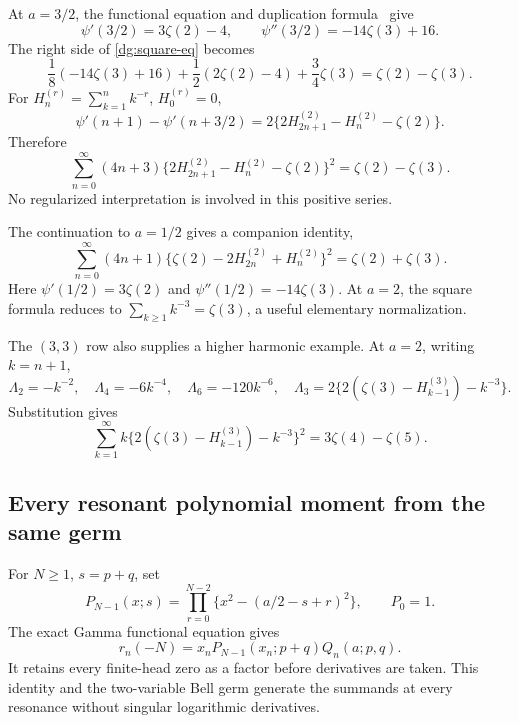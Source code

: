 At $a=3/2$, the functional equation and duplication formula~\cite{DLMFPolygamma} give
\[
 \psi'(3/2)=3\zeta(2)-4,\qquad
 \psi''(3/2)=-14\zeta(3)+16.
\]
The right side of \eqref{dg:square-eq} becomes
\[
 \frac18(-14\zeta(3)+16)
 +\frac12(2\zeta(2)-4)+\frac34\zeta(3)
 =\zeta(2)-\zeta(3).
\]
For $H_n^{(r)}=\sum_{k=1}^nk^{-r}$, $H_0^{(r)}=0$,
\[
 \psi'(n+1)-\psi'(n+3/2)
 =2\{2H_{2n+1}^{(2)}-H_n^{(2)}-\zeta(2)\}.
\]
Therefore
\begin{equation}
 \boxed{\sum_{n=0}^{\infty}(4n+3)
 \{2H_{2n+1}^{(2)}-H_n^{(2)}-\zeta(2)\}^{2}
 =\zeta(2)-\zeta(3).}
 \label{dg:half-harmonic-square}
\end{equation}
No regularized interpretation is involved in this positive series.

The continuation to $a=1/2$ gives a companion identity,
\begin{equation}
 \sum_{n=0}^{\infty}(4n+1)
 \{\zeta(2)-2H_{2n}^{(2)}+H_n^{(2)}\}^{2}
 =\zeta(2)+\zeta(3).
 \label{dg:other-half-harmonic-square}
\end{equation}
Here $\psi'(1/2)=3\zeta(2)$ and
$\psi''(1/2)=-14\zeta(3)$. At $a=2$, the square formula reduces to
$\sum_{k\geq1}k^{-3}=\zeta(3)$, a useful elementary normalization.

The $(3,3)$ row also supplies a higher harmonic example. At $a=2$,
writing $k=n+1$,
\[
 \Lambda_2=-k^{-2},\quad \Lambda_4=-6k^{-4},\quad
 \Lambda_6=-120k^{-6},\quad
 \Lambda_3=2\{2(\zeta(3)-H_{k-1}^{(3)})-k^{-3}\}.
\]
Substitution gives
\begin{equation}
 \boxed{\sum_{k=1}^{\infty}k
 \{2(\zeta(3)-H_{k-1}^{(3)})-k^{-3}\}^2
 =3\zeta(4)-\zeta(5).}
 \label{dg:cubic-tail-square}
\end{equation}

\subsection{Every resonant polynomial moment from the same germ}

For $N\geq1$, $s=p+q$, set
\[
 P_{N-1}(x;s)=\prod_{r=0}^{N-2}\{x^2-(a/2-s+r)^2\},\qquad P_0=1.
\]
The exact Gamma functional equation gives
\begin{equation}
 r_n(-N)=x_nP_{N-1}(x_n;p+q)Q_n(a;p,q).
 \label{dg:N-transport}
\end{equation}
It retains every finite-head zero as a factor before derivatives are
taken. This identity and the two-variable Bell germ generate the
summands at every resonance without singular logarithmic derivatives.

